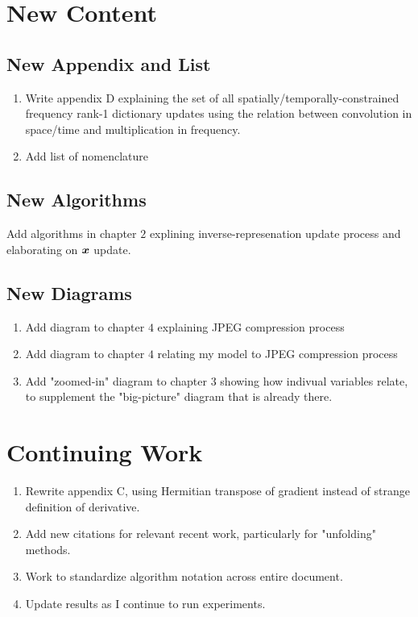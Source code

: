\documentclass{article}
\begin{document}
\section{New Content}
\subsection{New Appendix and List}
\begin{enumerate}
\item  Write appendix D explaining the set of all spatially/temporally-constrained frequency rank-1 dictionary updates using the relation between convolution in space/time and multiplication in frequency.


\item   Add list of nomenclature
\end{enumerate}

\subsection{New Algorithms}
Add algorithms in chapter $2$ explining inverse-represenation update process and elaborating on $\bm{x}$ update.

\subsection{New Diagrams}
\begin{enumerate}
\item
Add diagram to chapter $4$ explaining JPEG compression process
\item
Add diagram to chapter $4$ relating my model to JPEG compression process
\item
Add "zoomed-in" diagram to chapter $3$ showing how indivual variables relate, to supplement the "big-picture" diagram that is already there.
\end{enumerate}

\section{Continuing Work}
\begin{enumerate}
\item
Rewrite appendix C, using Hermitian transpose of gradient instead of strange definition of derivative.
\item
Add new citations for relevant recent work, particularly for "unfolding" methods.
\item
Work to standardize algorithm notation across entire document.
\item
Update results as I continue to run experiments.
\end{enumerate}
\end{document}
